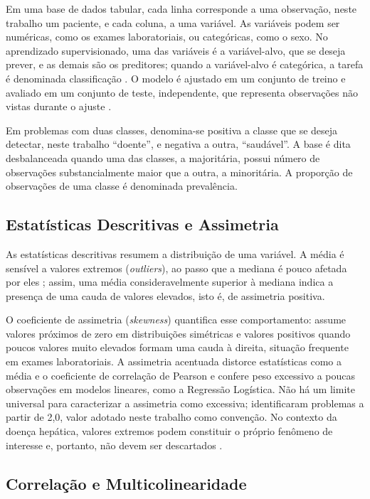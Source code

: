 Em uma base de dados tabular, cada linha corresponde a uma observação, neste trabalho um paciente, e cada coluna, a uma variável. As variáveis podem ser numéricas, como os exames laboratoriais, ou categóricas, como o sexo. No aprendizado supervisionado, uma das variáveis é a variável-alvo, que se deseja prever, e as demais são os preditores; quando a variável-alvo é categórica, a tarefa é denominada classificação \cite{elementsofstatiscal}. O modelo é ajustado em um conjunto de treino e avaliado em um conjunto de teste, independente, que representa observações não vistas durante o ajuste \cite{elementsofstatiscal}.

Em problemas com duas classes, denomina-se positiva a classe que se deseja detectar, neste trabalho ``doente'', e negativa a outra, ``saudável''. A base é dita desbalanceada quando uma das classes, a majoritária, possui número de observações substancialmente maior que a outra, a minoritária. A proporção de observações de uma classe é denominada prevalência.

\subsection{Estatísticas Descritivas e Assimetria}
\label{sec:fund_assimetria}

As estatísticas descritivas resumem a distribuição de uma variável. A média é sensível a valores extremos (\textit{outliers}), ao passo que a mediana é pouco afetada por eles \cite{han2012getting}; assim, uma média consideravelmente superior à mediana indica a presença de uma cauda de valores elevados, isto é, de assimetria positiva.

O coeficiente de assimetria (\textit{skewness}) quantifica esse comportamento: assume valores próximos de zero em distribuições simétricas e valores positivos quando poucos valores muito elevados formam uma cauda à direita, situação frequente em exames laboratoriais. A assimetria acentuada distorce estatísticas como a média e o coeficiente de correlação de Pearson e confere peso excessivo a poucas observações em modelos lineares, como a Regressão Logística. Não há um limite universal para caracterizar a assimetria como excessiva;  identificaram problemas a partir de 2,0, valor adotado neste trabalho como convenção. No contexto da doença hepática, valores extremos podem constituir o próprio fenômeno de interesse e, portanto, não devem ser descartados \cite[p.~237]{Aggarwal2015}.

\subsection{Correlação e Multicolinearidade}
\label{sec:fund_correlacao}

